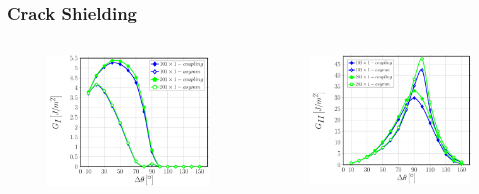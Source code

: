 \documentclass[first,firstsupp,lastsupp,last,hyperref,table]{ETHclass}
\begin{document}
\begin{frame}
\frametitle{\vspace{0.2cm}\small Crack Shielding}
\vspace{-1cm}
\centering
\begin{columns}[c]
\centering
\begin{column}{0.5\textwidth}
\centering
\begin{figure}
\centering
\includegraphics[width=\columnwidth]{nx1-coupling-vf60-GI-crackshield101.pdf}
\end{figure}
\end{column}
\begin{column}{0.5\textwidth}
\centering
\begin{figure}
\centering
\includegraphics[width=\columnwidth]{nx1-coupling-vf60-GII-crackshield101.pdf}

\end{figure}
\end{column}
\end{columns}
\end{frame}
\end{document}
